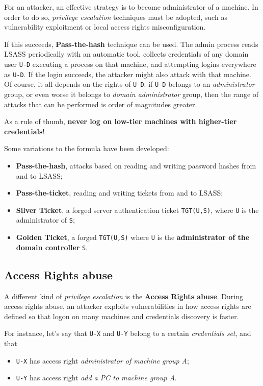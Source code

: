 \documentclass[10pt]{extreport}
\begin{document}
For an attacker, an effective strategy is to become administrator of a machine.
In order to do so, \emph{privilege escalation} techniques must be adopted, such
as vulnerability exploitment or local access rights misconfiguration.

If this succeeds, \textbf{Pass\--the\--hash} technique can be used. The admin
process reads LSASS periodically with an automatic tool, collects credentials
of any domain user \texttt{U-D} executing a process on that machine, and
attempting logins everywhere as \texttt{U-D}. If the login succeeds, the
attacker might also attack with that machine. Of course, it all depends on the
rights of \texttt{U-D}: if \texttt{U-D} belongs to an \emph{administrator}
group, or even worse it belongs to \emph{domain administrator} group, then the
range of attacks that can be performed is order of magnitudes greater.

As a rule of thumb, \textbf{never log on low\--tier machines with higher\--tier
credentials}!

Some variations to the formula have been developed:
\begin{itemize}
    \item \textbf{Pass\--the\--hash}, attacks based on reading and writing
        password hashes from and to LSASS;
    \item \textbf{Pass\--the\--ticket}, reading and writing tickets from and to
        LSASS;
    \item \textbf{Silver Ticket}, a forged server authentication ticket
        \texttt{TGT(U,S)}, where \texttt{U} is the administrator of \texttt{S};
    \item \textbf{Golden Ticket}, a forged \texttt{TGT(U,S)} where \texttt{U}
        is the \textbf{administrator of the domain controller} \texttt{S}.
\end{itemize}

\subsection{Access Rights abuse}

A different kind of \emph{privilege escalation} is the \textbf{Access Rights
abuse}. During access rights abuse, an attacker exploits vulnerabilities in how
access rights are defined so that logon on many machines and credentials
discovery is faster.


For instance, let's say that \texttt{U-X} and \texttt{U-Y} belong to a certain
\emph{credentials set}, and that
\begin{itemize}
    \item \texttt{U-X} has access right \emph{administrator of machine group
        A};
    \item \texttt{U-Y} has access right \emph{add a PC to machine group A}.
\end{itemize}
\end{document}
